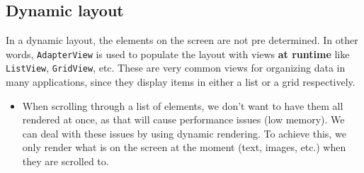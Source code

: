 \documentclass[12pt]{book}
\begin{document}
\subsection*{Dynamic layout}
In a dynamic layout, the elements on the screen are not pre determined. In other words, \texttt{AdapterView} is used to populate the layout with views \textbf{at runtime} like \texttt{ListView}, \texttt{GridView}, etc. These are very common views for organizing data in many applications, since they display items in either a list or a grid respectively.
\begin{itemize}
  \item When scrolling through a list of elements, we don't want to have them all rendered at once, as that will cause performance issues (low memory). We can deal with these issues by using dynamic rendering. To achieve this, we only render what is on the screen at the moment (text, images, etc.) when they are scrolled to.
\end{itemize}
\end{document}
